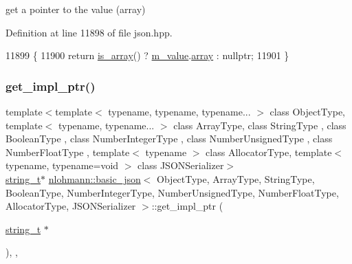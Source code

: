 get a pointer to the value (array) 



Definition at line 11898 of file json.\+hpp.


\begin{DoxyCode}
11899     \{
11900         \textcolor{keywordflow}{return} \hyperlink{classnlohmann_1_1basic__json_aef9ce5dd2381caee1f8ddcdb5bdd9c65}{is\_array}() ? \hyperlink{classnlohmann_1_1basic__json_aeb0814f76966f99290cb29e127c90a77}{m\_value}.\hyperlink{unionnlohmann_1_1basic__json_1_1json__value_a7947687f3ae1911d6e9847e2b3226157}{array} : \textcolor{keyword}{nullptr};
11901     \}
\end{DoxyCode}
\mbox{\label{classnlohmann_1_1basic__json_a955d7098e5b43ee0dd8cce5f707eeb5c}} 
\subsubsection{\texorpdfstring{get\+\_\+impl\+\_\+ptr()}{get\_impl\_ptr()}\hspace{0.1cm}{\footnotesize\ttfamily [5/14]}}
{\footnotesize\ttfamily template$<$template$<$ typename, typename, typename... $>$ class Object\+Type, template$<$ typename, typename... $>$ class Array\+Type, class String\+Type , class Boolean\+Type , class Number\+Integer\+Type , class Number\+Unsigned\+Type , class Number\+Float\+Type , template$<$ typename $>$ class Allocator\+Type, template$<$ typename, typename=void $>$ class J\+S\+O\+N\+Serializer$>$ \\
\hyperlink{classnlohmann_1_1basic__json_a61f8566a1a85a424c7266fb531dca005}{string\+\_\+t}$\ast$ \hyperlink{classnlohmann_1_1basic__json}{nlohmann\+::basic\+\_\+json}$<$ Object\+Type, Array\+Type, String\+Type, Boolean\+Type, Number\+Integer\+Type, Number\+Unsigned\+Type, Number\+Float\+Type, Allocator\+Type, J\+S\+O\+N\+Serializer $>$\+::get\+\_\+impl\+\_\+ptr (\begin{DoxyParamCaption}\item[{\hyperlink{classnlohmann_1_1basic__json_a61f8566a1a85a424c7266fb531dca005}{string\+\_\+t} $\ast$}]{ }\end{DoxyParamCaption})\hspace{0.3cm}{\ttfamily [inline]}, {\ttfamily [private]}, {\ttfamily [noexcept]}}



